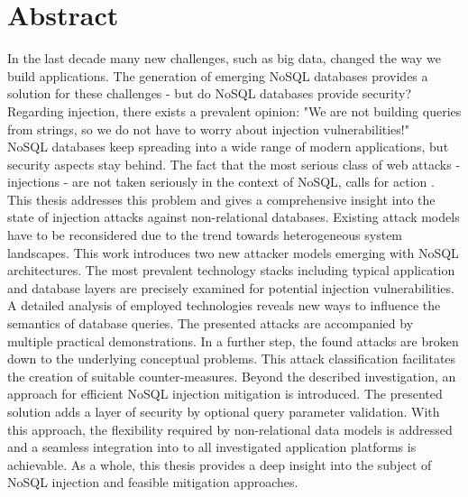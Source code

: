 \chapter*{Abstract} %
In the last decade many new challenges, such as big data, changed the way we build applications. The generation of emerging NoSQL databases provides a solution for these challenges - but do NoSQL databases provide security? Regarding injection, there exists a prevalent opinion: "We are not building queries from strings, so we do not have to worry about injection vulnerabilities!" \cite{MongoDB_Fundamentals:2016} \\

NoSQL databases keep spreading into a wide range of modern applications, but security aspects stay behind. The fact that the most serious class of web attacks - injections - are not taken seriously in the context of NoSQL, calls for action \cite{OWASP:2013b}. This thesis addresses this problem and gives a comprehensive insight into the state of injection attacks against non-relational databases. Existing attack models have to be reconsidered due to the trend towards heterogeneous system landscapes. This work introduces two new attacker models emerging with NoSQL architectures. The most prevalent technology stacks including typical application and database layers are precisely examined for potential injection vulnerabilities. A detailed analysis of employed technologies reveals new ways to influence the semantics of database queries. The presented attacks are accompanied by multiple practical demonstrations. In a further step, the found attacks are broken down to the underlying conceptual problems. This attack classification facilitates the creation of suitable counter-measures. Beyond the described investigation, an approach for efficient NoSQL injection mitigation is introduced. The presented solution adds a layer of security by optional query parameter validation. With this approach, the flexibility required by non-relational data models is addressed and a seamless integration into to all investigated application platforms is achievable. As a whole, this thesis provides a deep insight into the subject of NoSQL injection and feasible mitigation approaches.